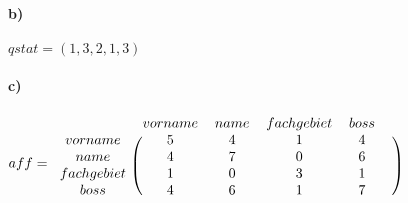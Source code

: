 \documentclass[11pt,a4paper,parskip=half ]{scrartcl}
\begin{document}
	\paragraph{b)}$ qstat = (1,3,2,1,3)$
	
	\paragraph{c)}$ aff = 
	\begin{blockarray}{cccccc}
	& vorname & name & fachgebiet & boss &  \\
	\begin{block}{c(ccccc)}
	vorname 	& 5 & 4 & 1 & 4 \\
	name 		& 4 & 7 & 0 & 6 \\
	fachgebiet 	& 1 & 0 & 3 & 1 \\
	boss 		& 4 & 6 & 1 & 7 \\
	\end{block}
	\end{blockarray}
	$
	
\end{document}
